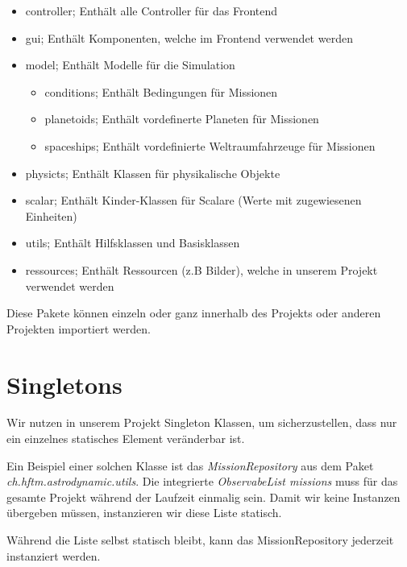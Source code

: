 \begin{itemize}
	\item controller; Enthält alle Controller für das Frontend
	\item gui; Enthält Komponenten, welche im Frontend verwendet werden
	\item model; Enthält Modelle für die Simulation
	\begin{itemize}
		\item conditions; Enthält Bedingungen für Missionen
		\item planetoids; Enthält vordefinerte Planeten für Missionen
		\item spaceships; Enthält vordefinierte Weltraumfahrzeuge für Missionen
	\end{itemize}
	\item physicts; Enthält Klassen für physikalische Objekte
	\item scalar; Enthält Kinder-Klassen für Scalare (Werte mit zugewiesenen Einheiten)
	\item utils; Enthält Hilfsklassen und Basisklassen
	\item ressources; Enthält Ressourcen (z.B Bilder), welche in unserem Projekt verwendet werden 
\end{itemize}

Diese Pakete können einzeln oder ganz innerhalb des Projekts oder anderen Projekten importiert werden.

\section{Singletons}

Wir nutzen in unserem Projekt Singleton Klassen, um sicherzustellen, dass nur ein einzelnes statisches Element veränderbar ist.

Ein Beispiel einer solchen Klasse ist das \textit{MissionRepository} aus dem Paket \textit{ch.hftm.astrodynamic.utils}.
Die integrierte \textit{ObservabeList missions} muss für das gesamte Projekt während der Laufzeit einmalig sein. Damit wir keine Instanzen übergeben müssen, instanzieren wir diese Liste statisch.

Während die Liste selbst statisch bleibt, kann das MissionRepository jederzeit instanziert werden.
